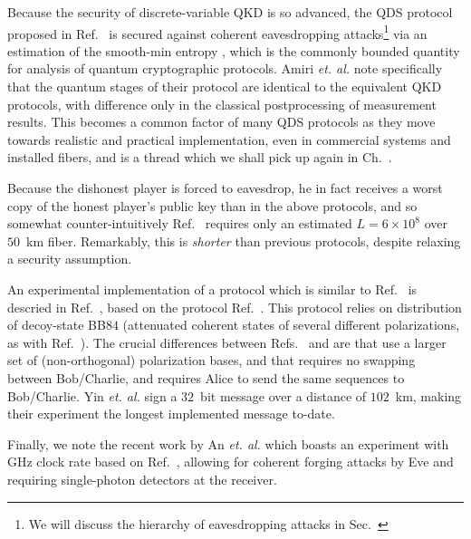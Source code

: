 Because the security of discrete-variable QKD is so advanced, the QDS protocol proposed in Ref.~\cite{Amiri2016} is secured against coherent eavesdropping attacks\footnote{We will discuss the hierarchy of eavesdropping attacks in Sec.~} via an estimation of the smooth-min entropy , which is the commonly bounded quantity for analysis of quantum cryptographic protocols. Amiri \emph{et. al.} note specifically that the quantum stages of their protocol are identical to the equivalent QKD protocols, with difference only in the classical postprocessing of measurement results. This becomes a common factor of many QDS protocols as they move towards realistic and practical implementation, even in commercial systems and installed fibers, and is a thread which we shall pick up again in Ch.~.

Because the dishonest player is forced to eavesdrop, he in fact receives a worst copy of the honest player's public key than in the above protocols, and so somewhat counter-intuitively Ref.~\cite{Amiri2016} requires only an estimated $L = 6\times 10^8$ over $50$~km fiber. Remarkably, this is \emph{shorter} than previous protocols, despite relaxing a security assumption.

An experimental implementation of a protocol which is similar to Ref.~\cite{Amiri2016} is descried in Ref.~\cite{Yin2017c}, based on the protocol Ref.~\cite{Yin2016a}. This protocol relies on distribution of decoy-state BB$84$ (attenuated coherent states of several different polarizations, as with Ref.~\cite{Amiri2016}). The crucial differences between Refs.~\cite{Amiri2016} and \cite{Yin2017c, Yin2016a} are that \cite{Yin2017c, Yin2016a} use a larger set of (non-orthogonal) polarization bases, and that \cite{Yin2017c, Yin2016a} requires no swapping between Bob/Charlie, and requires Alice to send the same sequences to Bob/Charlie. Yin \emph{et. al.} sign a $32$~bit message over a distance of $102$~km, making their experiment the longest implemented message to-date.



Finally, we note the recent work by An \emph{et. al.} \cite{An2019} which boasts an experiment with GHz clock rate based on Ref.~\cite{Amiri2016}, allowing for coherent forging attacks by Eve and requiring single-photon detectors at the receiver.



